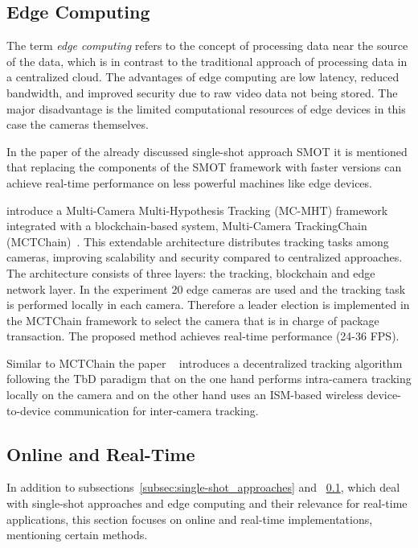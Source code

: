 \subsection{Edge Computing}\label{subsec:edge_computing}
The term \textit{edge computing} refers to the concept of processing data near the source of the data, which is in contrast to the traditional approach of processing data in a centralized cloud. The advantages of edge computing are low latency, reduced bandwidth, and improved security due to raw video data not being stored. The major disadvantage is the limited computational resources of edge devices in this case the cameras themselves.

In the paper of the already discussed single-shot approach SMOT it is mentioned that replacing the components of the SMOT framework with faster versions can achieve real-time performance on less powerful machines like edge devices.

\citeauthor{Wang23b} introduce a Multi-Camera Multi-Hypothesis Tracking (MC-MHT) framework integrated with a blockchain-based system, Multi-Camera TrackingChain (MCTChain)~\cite{Wang23b}. This extendable architecture distributes tracking tasks among cameras, improving scalability and security compared to centralized approaches. The architecture consists of three layers: the tracking, blockchain and edge network layer. In the experiment 20 edge cameras are used and the tracking task is performed locally in each camera. Therefore a leader election is implemented in the MCTChain framework to select the camera that is in charge of package transaction. The proposed method achieves real-time performance (24-36 FPS).

Similar to MCTChain the paper ~\cite{Nikodem20} introduces a decentralized tracking algorithm following the TbD paradigm that on the one hand performs intra-camera tracking locally on the camera and on the other hand uses an ISM-based wireless device-to-device communication for inter-camera tracking.

\subsection{Online and Real-Time}\label{subsec:online_and_real-time}
In addition to subsections~\ref{subsec:single-shot_approaches} and ~\ref{subsec:edge_computing}, which deal with single-shot approaches and edge computing and their relevance for real-time applications, this section focuses on online and real-time implementations, mentioning certain methods.

